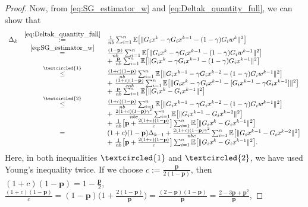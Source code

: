 \documentclass{article}
\newcommand{\norms}[1]{\Vert#1\Vert}
\newcommand{\Expk}[1]{\mathbb{E}\big[#1\big]}
\newcommand{\mbf}[1]{\mathbf{#1}}
\newcommand{\myeqc}[1]{ {\scriptsize\textcircled{#1}} }
\theoremstyle{plain}
\theoremstyle{definition}
\theoremstyle{remark}
\begin{document}
\begin{proof}
Now, from \eqref{eq:SG_estimator_w} and \eqref{eq:Deltak_quantity_full}, we can show that
\begin{equation*}
\begin{array}{lcl}
\Delta_k & \overset{\eqref{eq:Deltak_quantity_full}}{:=} &  \frac{1}{n b}  \sum_{i = 1}^n \Expk{  \norms{  G_ix^k - \gamma G_ix^{k-1} - (1-\gamma)G_iw^k }^2 } \\
& \overset{\eqref{eq:SG_estimator_w}}{ = } &  \frac{(1 - \mbf{p})}{n b}  \sum_{i = 1}^n \Expk{  \norms{  G_ix^k - \gamma G_ix^{k-1} - (1 - \gamma)G_iw^{k-1} }^2 } \\
&& +  {~}  \frac{ \mbf{p}}{n b}  \sum_{i = 1}^n \Expk{  \norms{  G_ix^k - \gamma G_ix^{k-1} - (1-\gamma)G_ix^{k-1} }^2 } \\
&\overset{\myeqc{1}}{ \leq } &  \frac{(1+c)(1- \mbf{p} )}{nb}  \sum_{i = 1}^n \Expk{ \norms{G_ix^{k-1} - \gamma G_ix^{k-2}   - (1-\gamma)G_iw^{k-1}}^2 }\\
&& + {~} \frac{(1 + c)(1 - \mbf{p} )}{c n b}  \sum_{i = 1}^n \Expk{ \norms{   G_ix^k - \gamma G_ix^{k-1}  -  [G_ix^{k-1} - \gamma G_ix^{k-2}] }^2 } \\
&& + {~} \frac{ \mbf{p} }{ n b }  \sum_{i = 1}^n \Expk { \norms{ G_ix^k - G_ix^{k-1} }^2 } \\
&\overset{\myeqc{2}}{ \leq } &  \frac{ (1+c)(1- \mbf{p} )}{n b}   \sum_{i = 1}^n \Expk{ \norms{G_ix^{k-1} - \gamma G_ix^{k-2}   - (1-\gamma)G_iw^{k-1}}^2 }\\
&& + {~} \frac{2(1 + c)(1 - \mbf{p} ) \gamma^2  }{n b c  }  \sum_{i = 1}^n \Expk{ \norms{   G_ix^{k-1} - G_ix^{k-2} }^2 } \\
&& + {~} \frac{1}{n b}\big[ \mbf{p} + \frac{2(1 + c)(1 - \mbf{p} )}{c} \big]   \sum_{i = 1}^n \Expk{ \norms{ G_ix^k - G_ix^{k-1} }^2 } \\
& =  &  (1+c)(1- \mbf{p} )  \Delta_{k-1}  + \frac{2(1 + c)(1 - \mbf{p} ) \gamma^2  }{n b c }  \sum_{i = 1}^n \Expk{ \norms{   G_ix^{k-1} - G_ix^{k-2} }^2 } \\
&& + {~} \frac{1}{n b}\big[ \mbf{p} + \frac{2(1 + c)(1 - \mbf{p} )}{c} \big]   \sum_{i = 1}^n \Expk{ \norms{ G_ix^k - G_ix^{k-1} }^2 }.
\end{array}
\end{equation*}
Here, in both inequalities $\myeqc{1}$ and $\myeqc{2}$, we have used Young's inequality twice.
If we choose $c := \frac{ \mbf{p} }{2(1 - \mbf{p} )}$, then $(1+c)(1 - \mbf{p} ) = 1 - \frac{\mbf{p}}{2}$, $\frac{(1+c)(1 - \mbf{p})}{c} = (1 - \mbf{p})\big(1 + \frac{2(1 - \mbf{p} )}{\mbf{p} }\big) = \frac{(2- \mbf{p} )(1- \mbf{p} )}{\mbf{p} } = \frac{2 - 3 \mbf{p} + \mbf{p}^2}{ \mbf{p} }$, %

\end{proof}
\end{document}
